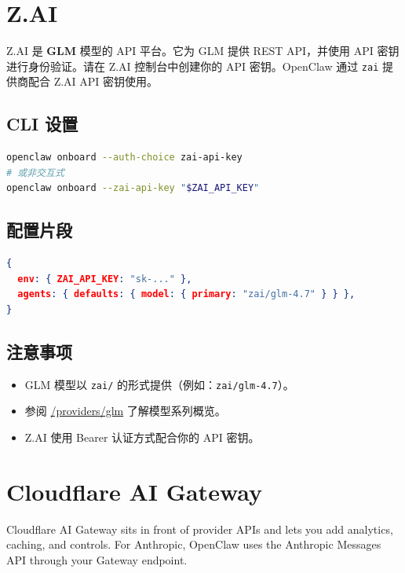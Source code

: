 \clearpage

\section{Z.AI}


Z.AI 是 \textbf{GLM} 模型的 API 平台。它为 GLM 提供 REST API，并使用 API 密钥进行身份验证。请在 Z.AI 控制台中创建你的 API 密钥。OpenClaw 通过 \texttt{zai} 提供商配合 Z.AI API 密钥使用。

\subsection{CLI 设置}


\begin{lstlisting}[language=bash]
openclaw onboard --auth-choice zai-api-key
# 或非交互式
openclaw onboard --zai-api-key "$ZAI_API_KEY"
\end{lstlisting}


\subsection{配置片段}


\begin{lstlisting}[language=json]
{
  env: { ZAI_API_KEY: "sk-..." },
  agents: { defaults: { model: { primary: "zai/glm-4.7" } } },
}
\end{lstlisting}


\subsection{注意事项}


\begin{itemize}
  \item GLM 模型以 \texttt{zai/} 的形式提供（例如：\texttt{zai/glm-4.7}）。
  \item 参阅 \href{/providers/glm}{/providers/glm} 了解模型系列概览。
  \item Z.AI 使用 Bearer 认证方式配合你的 API 密钥。
\end{itemize}



\clearpage
\section{Cloudflare AI Gateway}


Cloudflare AI Gateway sits in front of provider APIs and lets you add analytics, caching, and controls. For Anthropic, OpenClaw uses the Anthropic Messages API through your Gateway endpoint.

